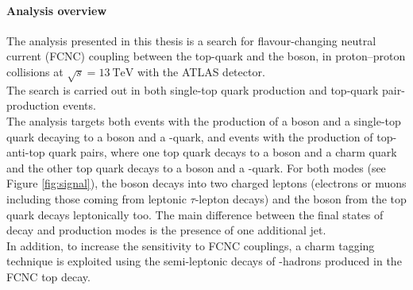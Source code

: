 \paragraph{Analysis overview}
The analysis presented in this thesis is a search for flavour-changing
neutral current (FCNC) coupling between the top-quark and the \PZ
boson, in proton--proton collisions at $\sqrt{s} = \SI{13}{\TeV}$ with
the ATLAS detector. \\
The search is carried out in both single-top quark production and
top-quark pair-production events.\\
The analysis targets both events with the production of a \PZ boson and a single-top quark decaying to a \PW boson and a \Pqb-quark, and events with the production of top-anti-top quark pairs, where one top quark decays to a \PZ boson and a charm quark and the other top quark decays to a \PW boson and a \Pqb-quark. For both modes (see Figure \ref{fig:signal}), the \PZ boson decays into two charged leptons (electrons or muons including those coming from leptonic $\tau$-lepton decays) and the \PW boson from the top quark decays leptonically too. 
The main difference between the final states of decay and production modes is the presence of one additional jet. \\
In addition, to increase the sensitivity to FCNC \tZc couplings, 
a charm tagging technique is exploited using
the semi-leptonic decays of \Pqc-hadrons produced in the FCNC top
decay. 

